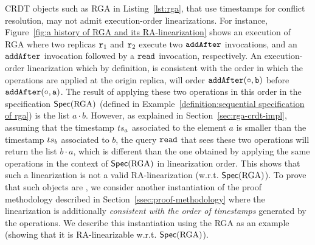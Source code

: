 CRDT objects such as RGA in Listing~\ref{lst:rga}, that use timestamps for conflict resolution, may not admit execution-order linearizations. 
For instance, Figure~\ref{fig:a history of RGA and its RA-linearization} shows an execution of RGA where two replicas $\mathtt{r}_1$ and $\mathtt{r}_2$ execute two ${\tt addAfter}$ invocations, and an ${\tt addAfter}$ invocation followed by a ${\tt read}$ invocation, respectively. An execution-order linearization which by definition, is consistent with the order in which the operations are applied at the origin replica, will order $\alabelshort[{\tt addAfter}]{\circ,b}$ before $\alabelshort[{\tt addAfter}]{\circ,a}$. The result of applying these two operations in this order in the specification $\mathsf{Spec}(\text{RGA})$ (defined in Example~\ref{definition:sequential specification of rga}) is the list $a\cdot b$. However, as explained in Section~\ref{sec:rga-crdt-impl}, assuming that the timestamp $ts_a$ associated to the element $a$ is smaller than the timestamp $ts_b$ associated to $b$, the query ${\tt read}$ that sees these two operations will return the list $b\cdot a$, which is different than the one obtained by applying the same operations in the context of $\mathsf{Spec}(\text{RGA})$ in linearization order. This shows that such a linearization is not a valid RA-linearization (w.r.t. $\mathsf{Spec}(\text{RGA})$).
To prove that such objects are \crdtlinearizable{}, we consider another instantiation of the proof methodology described in Section~\ref{ssec:proof-methodology} where the linearization is additionally \emph{consistent with the order of timestamps} generated by the operations.
We describe this instantiation using the RGA as an example (showing that it is RA-linearizable w.r.t. $\mathsf{Spec}(\text{RGA})$).

